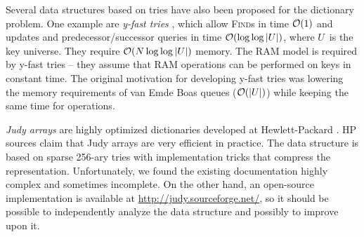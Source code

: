 Several data structures based on tries have also been proposed for the
dictionary problem. One example are \emph{y-fast tries} \cite{y-fast},
which allow \textsc{Find}s in time $\mathcal{O}(1)$ and updates and predecessor/successor
queries in time $\mathcal{O}(\log\log |U|)$, where $U$~is the key universe. They require
$\mathcal{O}(N \log\log |U|)$ memory.
The RAM model is required by y-fast tries -- they assume that RAM operations
can be performed on keys in constant time.
The original motivation for developing y-fast tries was lowering the memory
requirements of van Emde Boas queues ($\mathcal{O}(|U|)$) while keeping the same time
for operations.

\emph{Judy arrays} are highly optimized dictionaries developed at
Hewlett-Packard \cite{judy-shop-manual, judy-patent}.
HP sources claim that Judy arrays are very efficient in practice.
The data structure is based on sparse 256-ary tries with implementation tricks
that compress the representation.
Unfortunately, we found the existing documentation highly complex and sometimes
incomplete. On the other hand, an open-source implementation is available
at \url{http://judy.sourceforge.net/}, so it should be possible to independently
analyze the data structure and possibly to improve upon it.
